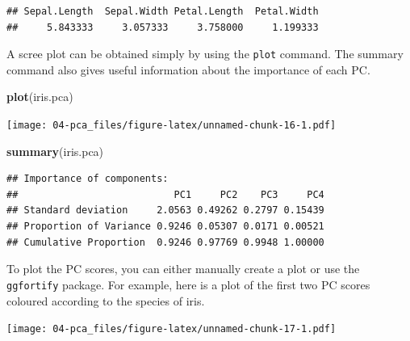 \documentclass[
]{book}
\newenvironment{Shaded}{\begin{snugshade}}{\end{snugshade}}
\newcommand{\AttributeTok}[1]{\textcolor[rgb]{0.13,0.29,0.53}{#1}}
\newcommand{\DecValTok}[1]{\textcolor[rgb]{0.00,0.00,0.81}{#1}}
\newcommand{\FunctionTok}[1]{\textcolor[rgb]{0.13,0.29,0.53}{\textbf{#1}}}
\newcommand{\NormalTok}[1]{#1}
\newcommand{\OtherTok}[1]{\textcolor[rgb]{0.56,0.35,0.01}{#1}}
\newcommand{\SpecialCharTok}[1]{\textcolor[rgb]{0.81,0.36,0.00}{\textbf{#1}}}
\theoremstyle{definition}
\theoremstyle{definition}
\theoremstyle{definition}
\theoremstyle{definition}
\theoremstyle{remark}
\begin{document}
\begin{verbatim}
## Sepal.Length  Sepal.Width Petal.Length  Petal.Width 
##     5.843333     3.057333     3.758000     1.199333
\end{verbatim}

A scree plot can be obtained simply by using the \texttt{plot} command. The summary command also gives useful information about the importance of each PC.

\begin{Shaded}
\begin{Highlighting}[]
\FunctionTok{plot}\NormalTok{(iris.pca)}
\end{Highlighting}
\end{Shaded}

\texttt{[image: 04-pca\_files/figure-latex/unnamed-chunk-16-1.pdf]}

\begin{Shaded}
\begin{Highlighting}[]
\FunctionTok{summary}\NormalTok{(iris.pca)}
\end{Highlighting}
\end{Shaded}

\begin{verbatim}
## Importance of components:
##                           PC1     PC2    PC3     PC4
## Standard deviation     2.0563 0.49262 0.2797 0.15439
## Proportion of Variance 0.9246 0.05307 0.0171 0.00521
## Cumulative Proportion  0.9246 0.97769 0.9948 1.00000
\end{verbatim}

To plot the PC scores, you can either manually create a plot or use the \texttt{ggfortify} package. For example, here is a plot of the first two PC scores coloured according to the species of iris.

\begin{Shaded}
\end{Shaded}

\texttt{[image: 04-pca\_files/figure-latex/unnamed-chunk-17-1.pdf]}
\end{document}
